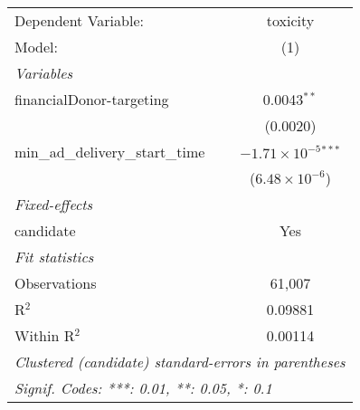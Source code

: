 
\begingroup
\centering
\begin{tabular}{lc}
   \tabularnewline \midrule \midrule
   Dependent Variable:                & toxicity\\  
   Model:                             & (1)\\  
   \midrule
   \emph{Variables}\\
   financialDonor-targeting           & 0.0043$^{**}$\\   
                                      & (0.0020)\\   
   min\_ad\_delivery\_start\_time     & $-1.71\times 10^{-5}$$^{***}$\\    
                                      & ($6.48\times 10^{-6}$)\\    
   \midrule
   \emph{Fixed-effects}\\
   candidate                          & Yes\\  
   \midrule
   \emph{Fit statistics}\\
   Observations                       & 61,007\\  
   R$^2$                              & 0.09881\\  
   Within R$^2$                       & 0.00114\\  
   \midrule \midrule
   \multicolumn{2}{l}{\emph{Clustered (candidate) standard-errors in parentheses}}\\
   \multicolumn{2}{l}{\emph{Signif. Codes: ***: 0.01, **: 0.05, *: 0.1}}\\
\end{tabular}
\par\endgroup




